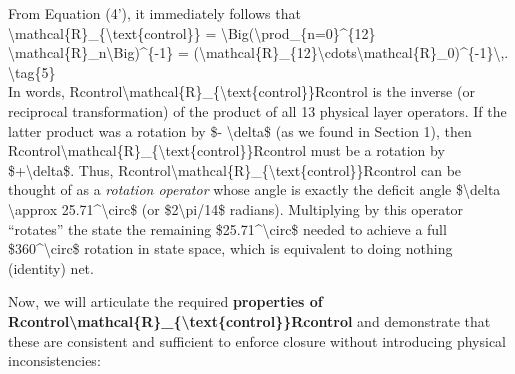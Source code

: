 \documentclass[
]{article}
\begin{document}
From Equation (4'), it immediately follows that\\
\textbackslash mathcal\{R\}\_\{\textbackslash text\{control\}\} =
\textbackslash Big(\textbackslash prod\_\{n=0\}\^{}\{12\}
\textbackslash mathcal\{R\}\_n\textbackslash Big)\^{}\{-1\} =
(\textbackslash mathcal\{R\}\_\{12\}\textbackslash cdots\textbackslash mathcal\{R\}\_0)\^{}\{-1\}\textbackslash,.
\textbackslash tag\{5\}\\
In words,
Rcontrol\textbackslash mathcal\{R\}\_\{\textbackslash text\{control\}\}Rcontrol\hspace{0pt}
is the inverse (or reciprocal transformation) of the product of all 13
physical layer operators. If the latter product was a rotation by \$-
\textbackslash delta\$ (as we found in Section 1), then
Rcontrol\textbackslash mathcal\{R\}\_\{\textbackslash text\{control\}\}Rcontrol\hspace{0pt}
must be a rotation by \$+\textbackslash delta\$. Thus,
Rcontrol\textbackslash mathcal\{R\}\_\{\textbackslash text\{control\}\}Rcontrol\hspace{0pt}
can be thought of as a \emph{rotation operator} whose angle is exactly
the deficit angle \$\textbackslash delta \textbackslash approx
25.71\^{}\textbackslash circ\$ (or \$2\textbackslash pi/14\$ radians).
Multiplying by this operator ``rotates'' the state the remaining
\$25.71\^{}\textbackslash circ\$ needed to achieve a full
\$360\^{}\textbackslash circ\$ rotation in state space, which is
equivalent to doing nothing (identity) net.

Now, we will articulate the required \textbf{properties of
Rcontrol\textbackslash mathcal\{R\}\_\{\textbackslash text\{control\}\}Rcontrol\hspace{0pt}}
and demonstrate that these are consistent and sufficient to enforce
closure without introducing physical inconsistencies:
\end{document}
